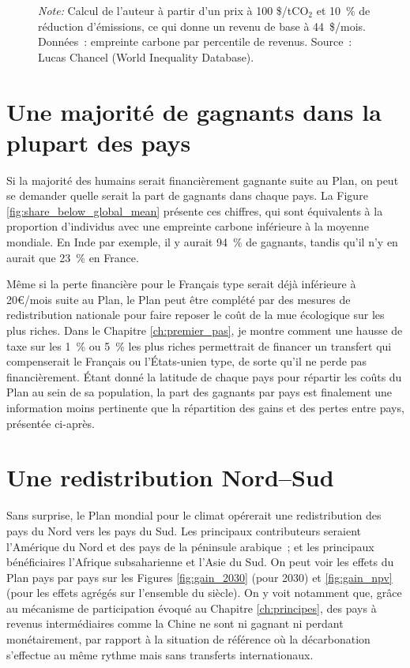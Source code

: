 \documentclass[a5paper,french]{memoir}
\begin{document}
\begin{figure}[h!]
\begin{subfigure}{.5\textwidth}
\end{subfigure}
{\footnotesize \textit{Note:} Calcul de l'auteur à partir d'un prix à 100 \$/tCO$_\text{2}$ et 10~\% de réduction d'émissions, ce qui donne un revenu de base à 44~\$/mois. Données~: empreinte carbone par percentile de revenus. Source~: Lucas Chancel (World Inequality Database).}
\end{figure}

\section{Une majorité de gagnants dans la plupart des pays}

Si la majorité des humains serait financièrement gagnante suite au Plan, on peut se demander quelle serait la part de gagnants dans chaque pays. La Figure \ref{fig:share_below_global_mean} présente ces chiffres, qui sont équivalents à la proportion d'individus avec une empreinte carbone inférieure à la moyenne mondiale. En Inde par exemple, il y aurait 94~\% de gagnants, tandis qu'il n'y en aurait que 23~\% en France.  

Même si la perte financière pour le Français type serait déjà inférieure à 20\euro{}/mois suite au Plan, le Plan peut être complété par des mesures de redistribution nationale pour faire reposer le coût de la mue écologique sur les plus riches. Dans le Chapitre \ref{ch:premier_pas}, je montre comment une hausse de taxe sur les 1~\% ou 5~\% les plus riches permettrait de financer un transfert qui compenserait le Français ou l'États-unien type, de sorte qu'il ne perde pas financièrement. Étant donné la latitude de chaque pays pour répartir les coûts du Plan au sein de sa population, la part des gagnants par pays est finalement une information moins pertinente que la répartition des gains et des pertes entre pays, présentée ci-après.


\section{Une redistribution Nord--Sud}

Sans surprise, le Plan mondial pour le climat opérerait une redistribution des pays du Nord vers les pays du Sud. Les principaux contributeurs seraient l'Amérique du Nord et des pays de la péninsule arabique~; et les principaux bénéficiaires l'Afrique subsaharienne et l'Asie du Sud. On peut voir les effets du Plan pays par pays sur les Figures \ref{fig:gain_2030} (pour 2030) et \ref{fig:gain_npv} (pour les effets agrégés sur l'ensemble du siècle). On y voit notamment que, grâce au mécanisme de participation évoqué au Chapitre \ref{ch:principes}, des pays à revenus intermédiaires comme la Chine ne sont ni gagnant ni perdant monétairement, par rapport à la situation de référence où la décarbonation s'effectue au même rythme mais sans transferts internationaux. 
\end{document}
